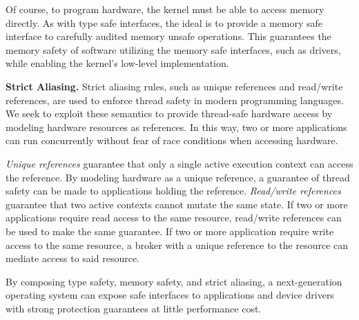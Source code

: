 
Of course, to program hardware, the kernel must be able to access memory
directly. As with type safe interfaces, the ideal is to provide a memory safe
interface to carefully audited memory unsafe operations. This guarantees the
memory safety of software utilizing the memory safe interfaces, such as drivers,
while enabling the kernel's low-level implementation.

\textbf{Strict Aliasing.}
Strict aliasing rules, such as unique references and read/write references, are
used to enforce thread safety in modern programming languages. We seek to
exploit these semantics to provide thread-safe hardware access by modeling
hardware resources as references. In this way, two or more applications can run
concurrently without fear of race conditions when accessing hardware.


\textit{Unique references} guarantee that only a single active execution context
can access the reference. By modeling hardware as a unique reference, a
guarantee of thread safety can be made to applications holding the reference.
\textit{Read/write references} guarantee that two active contexts cannot mutate
the same state. If two or more applications require read access to the same
resource, read/write references can be used to make the same guarantee. If two
or more application require write access to the same resource, a broker with a
unique reference to the resource can mediate access to said resource.

By composing type safety, memory safety, and strict aliasing, a next-generation
operating system can expose safe interfaces to applications and device drivers
with strong protection guarantees at little performance cost.
